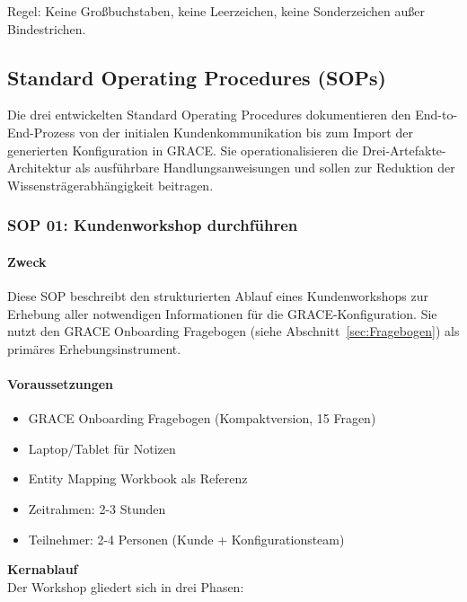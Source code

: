 \noindent Regel: Keine Großbuchstaben, keine Leerzeichen, keine Sonderzeichen außer Bindestrichen.


\subsection{Standard Operating Procedures (SOPs)}
\label{sec:SOPs}

Die drei entwickelten Standard Operating Procedures dokumentieren den End-to-End-Prozess von der initialen Kundenkommunikation bis zum Import der generierten Konfiguration in GRACE. Sie operationalisieren die Drei-Artefakte-Architektur als ausführbare Handlungsanweisungen und sollen zur Reduktion der Wissensträgerabhängigkeit beitragen.

\subsubsection{SOP 01: Kundenworkshop durchführen}

\paragraph{Zweck}

Diese SOP beschreibt den strukturierten Ablauf eines Kundenworkshops zur Erhebung aller notwendigen Informationen für die GRACE-Konfiguration. Sie nutzt den GRACE Onboarding Fragebogen (siehe Abschnitt~\ref{sec:Fragebogen}) als primäres Erhebungsinstrument.

\paragraph{Voraussetzungen}

\begin{itemize}
    \item GRACE Onboarding Fragebogen (Kompaktversion, 15 Fragen)
    \item Laptop/Tablet für Notizen
    \item Entity Mapping Workbook als Referenz
    \item Zeitrahmen: 2-3 Stunden
    \item Teilnehmer: 2-4 Personen (Kunde + Konfigurationsteam)
\end{itemize}

\noindent \textbf{Kernablauf}
\\
\noindent Der Workshop gliedert sich in drei Phasen:

